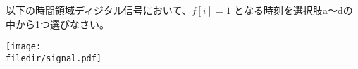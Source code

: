 以下の時間領域ディジタル信号において、$f[i]=1$ となる時刻を選択肢a〜dの中から1つ選びなさい。

\centering\texttt{[image: \\filedir/signal.pdf]}
